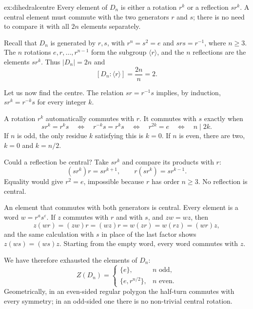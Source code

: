 \begin{solution}{ex:dihedralcentre}
\idea Every element of $D_n$ is either a rotation $r^k$ or a reflection $sr^k$. A central element must commute with the two generators $r$ and $s$; there is no need to compare it with all $2n$ elements separately.

\writeup Recall that $D_n$ is generated by $r,s$, with $r^n=s^2=e$ and $srs=r^{-1}$, where $n\ge3$.
The $n$ rotations $e,r,\ldots,r^{n-1}$ form the subgroup $\langle r\rangle$, and the $n$ reflections are the elements $sr^k$. Thus $|D_n|=2n$ and
\[
[D_n:\langle r\rangle]=\frac{2n}{n}=2.
\]

Let us now find the centre. The relation $sr=r^{-1}s$ implies, by induction, $sr^k=r^{-k}s$ for every integer $k$.

A rotation $r^k$ automatically commutes with $r$. It commutes with $s$ exactly when
\[
sr^k=r^ks
\quad\Longleftrightarrow\quad
r^{-k}s=r^ks
\quad\Longleftrightarrow\quad
r^{2k}=e
\quad\Longleftrightarrow\quad n\mid2k.
\]
If $n$ is odd, the only residue $k$ satisfying this is $k=0$. If $n$ is even, there are two, $k=0$ and $k=n/2$.

Could a reflection be central? Take $sr^k$ and compare its products with $r$:
\[
(sr^k)r=sr^{k+1},
\qquad
r(sr^k)=sr^{k-1}.
\]
Equality would give $r^2=e$, impossible because $r$ has order $n\ge3$. No reflection is central.

An element that commutes with both generators is central. Every element is a word $w=r^as^\varepsilon$. If $z$ commutes with $r$ and with $s$, and $zw=wz$, then
\[
z(wr)=(zw)r=(wz)r=w(zr)=w(rz)=(wr)z,
\]
and the same calculation with $s$ in place of the last factor shows $z(ws)=(ws)z$. Starting from the empty word, every word commutes with $z$.

We have therefore exhausted the elements of $D_n$:
\[
\boxed{Z(D_n)=
\begin{cases}
\{e\},&n\text{ odd},\\
\{e,r^{n/2}\},&n\text{ even}.
\end{cases}}
\]
Geometrically, in an even-sided regular polygon the half-turn commutes with every symmetry; in an odd-sided one there is no non-trivial central rotation.
\end{solution}

